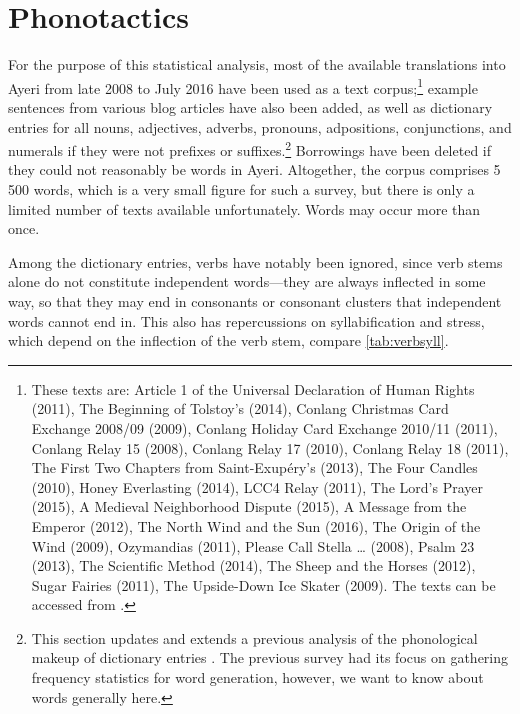 \section{Phonotactics}
\label{sec:phonotactics}

For the purpose of this statistical analysis, most of the available
translations into Ayeri from late 2008 to July 2016 have been used as a text
corpus;\footnote{These texts are: Article 1 of the Universal Declaration of
Human Rights (2011), The Beginning of Tolstoy's  (2014),
Conlang Christmas Card Exchange 2008/09 (2009), Conlang Holiday Card Exchange
2010/11 (2011), Conlang Relay 15 (2008), Conlang Relay 17 (2010), Conlang Relay
18 (2011), The First Two Chapters from Saint-Exupéry's 
(2013), The Four Candles (2010), Honey Everlasting (2014), LCC4 Relay (2011),
The Lord's Prayer (2015), A Medieval Neighborhood Dispute (2015), A Message
from the Emperor (2012), The North Wind and the Sun (2016), The Origin of the
Wind (2009), Ozymandias (2011), Please Call Stella … (2008), Psalm 23 (2013),
The Scientific Method (2014), The Sheep and the Horses (2012), Sugar Fairies
(2011), The Upside-Down Ice Skater (2009). The texts can be accessed from
\citet[Examples]{benung}.\label{fn:phonocorpus} } example sentences from
various blog articles have also been added, as well as dictionary entries for
all nouns, adjectives, adverbs, pronouns, adpositions, conjunctions, and
numerals if they were not prefixes or suffixes.\footnote{This section updates
and extends a previous analysis of the phonological makeup of dictionary
entries \autocite{becker:frequency}. The previous survey had its focus on
gathering frequency statistics for word generation, however, we want to know
about words generally here.} Borrowings have been deleted if they could not
reasonably be words in Ayeri. Altogether, the corpus comprises 5\,500 words,
which is a very small figure for such a survey, but there is only a limited
number of texts available unfortunately. Words may occur more than once.

Among the dictionary entries, verbs have notably been ignored, since verb stems
alone do not constitute independent words---they are always inflected in some
way, so that they may end in consonants or consonant clusters that independent
words cannot end in. This also has repercussions on syllabification and stress,
which depend on the inflection of the verb stem, compare
\autoref{tab:verbsyll}.

